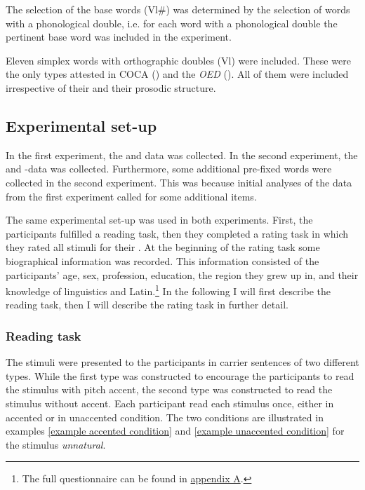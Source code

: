 The selection of the base words (Vl\#) was determined by the selection of words with a phonological double, i.e.  for each word with a phonological double the pertinent base word was included in the experiment. 

Eleven simplex words with orthographic doubles (Vl) were included. These were the only types attested in  {COCA} (\citealt{Davies.20082014}) and the \textit{OED} (\citealt{OED.2013}). 
All of them were included irrespective of their  and their prosodic structure. 





\subsection{Experimental set-up}

In the first experiment, the  and data was collected.
In the second experiment, the  and -data was collected. Furthermore, some additional pre-fixed words were collected in the second experiment. 
This was because initial analyses of the data from the first experiment called for some additional items.
 
 The same experimental set-up was used in both experiments. First, the participants fulfilled a reading task, then they completed a rating task in which they rated all stimuli for their . 
 At the beginning of the rating task some biographical information was recorded. This information consisted of the participants' age, sex, profession, education, the region they grew up in, and their knowledge of linguistics and Latin.\footnote{The full questionnaire can be found in \hyperref[Appendix A: Decomposability Rating]{appendix A}.}  In the following I will first describe the reading task, then I will describe the rating task in further detail. 

\subsubsection{Reading task}


The stimuli were presented to the participants in carrier sentences of two different types. 
While the first type was constructed to encourage the participants to read the stimulus with pitch accent, the second type was constructed to read the stimulus without accent. Each participant read each stimulus once, either in accented or in unaccented condition. 
The two conditions are illustrated in examples \ref{example accented condition}  and \ref{example unaccented condition} for the stimulus \textit{unnatural}.  


